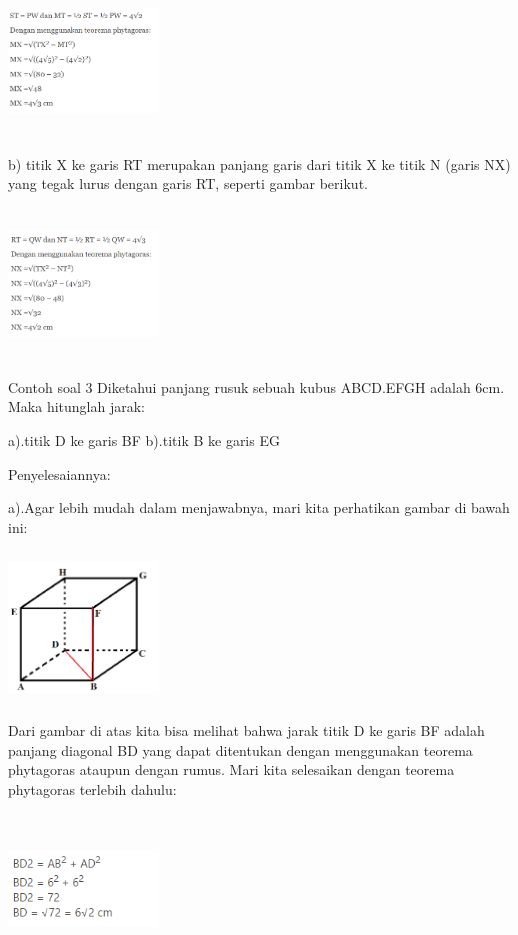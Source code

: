 \documentclass[11pt,fleqn]{book} %
\begin{document}
\includegraphics[width = 4cm, height= 4cm]{Pictures/gi14.png}

b) titik X ke garis RT merupakan panjang garis dari titik X ke titik N (garis NX) yang tegak lurus dengan garis RT, seperti gambar berikut.

\includegraphics[width = 4cm, height= 4cm]{Pictures/gi15.png}


Contoh soal 3
Diketahui panjang rusuk sebuah kubus ABCD.EFGH adalah 6cm. Maka hitunglah jarak:

a).titik D ke garis BF
b).titik B ke garis EG

Penyelesaiannya:

a).Agar lebih mudah dalam menjawabnya, mari kita perhatikan gambar di bawah ini:

\includegraphics[width = 4cm, height= 4cm]{Pictures/gi16.png}

Dari gambar di atas kita bisa melihat bahwa jarak titik D ke garis BF adalah panjang diagonal BD yang dapat ditentukan dengan menggunakan teorema phytagoras ataupun dengan rumus. Mari kita selesaikan dengan teorema phytagoras terlebih dahulu:

\includegraphics[width = 4cm, height= 4cm]{Pictures/gi17.png}
\end{document}
